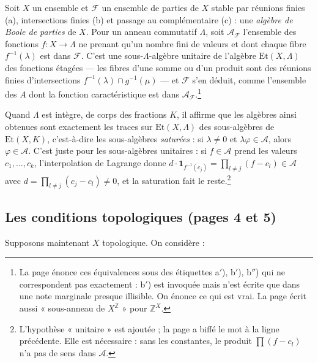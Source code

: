 \documentclass[11pt,a4paper]{article}
\begin{document}
Soit $X$ un ensemble et $\mathcal{F}$ un ensemble de parties de $X$ stable par
réunions finies (a), intersections finies (b) et passage au complémentaire
(c) : une \emph{algèbre de Boole de parties} de $X$. Pour un anneau commutatif
$\Lambda$, soit $\mathcal{A}_{\mathcal{F}}$ l'ensemble des fonctions
$f : X \to \Lambda$ ne prenant qu'un nombre fini de valeurs et dont chaque
fibre $f^{-1}(\lambda)$ est dans $\mathcal{F}$. C'est une sous-$\Lambda$-algèbre
unitaire de l'algèbre $\mathrm{Et}(X, \Lambda)$ des fonctions étagées — les
fibres d'une somme ou d'un produit sont des réunions finies d'intersections
$f^{-1}(\lambda) \cap g^{-1}(\mu)$ — et $\mathcal{F}$ s'en déduit, comme
l'ensemble des $A$ dont la fonction caractéristique est dans
$\mathcal{A}_{\mathcal{F}}$.\footnote{La page énonce ces équivalences sous des
étiquettes a$'$), b$'$), b$''$) qui ne correspondent pas exactement : b$'$)
est invoquée mais n'est écrite que dans une note marginale presque illisible.
On énonce ce qui est vrai. La page écrit aussi « sous-anneau de
$X^{\mathbb{Z}}$ » pour $\mathbb{Z}^X$.}

Quand $\Lambda$ est intègre, de corps des fractions $K$, il affirme que les
algèbres ainsi obtenues sont exactement les traces sur $\mathrm{Et}(X,\Lambda)$
des sous-algèbres de $\mathrm{Et}(X, K)$, c'est-à-dire les sous-algèbres
\emph{saturées} : si $\lambda \neq 0$ et $\lambda \varphi \in \mathcal{A}$, alors
$\varphi \in \mathcal{A}$. C'est juste pour les sous-algèbres unitaires : si
$f \in \mathcal{A}$ prend les valeurs $c_1, \dots, c_k$, l'interpolation de
Lagrange donne $d \cdot \mathbf{1}_{f^{-1}(c_j)} = \prod_{l \neq j} (f - c_l)
\in \mathcal{A}$ avec $d = \prod_{l \neq j}(c_j - c_l) \neq 0$, et la
saturation fait le reste.\footnote{L'hypothèse « unitaire » est ajoutée ; la
page a biffé le mot à la ligne précédente. Elle est nécessaire : sans les
constantes, le produit $\prod (f - c_l)$ n'a pas de sens dans $\mathcal{A}$.}

\subsection*{Les conditions topologiques (pages 4 et 5)}

Supposons maintenant $X$ topologique. On considère :
\end{document}
